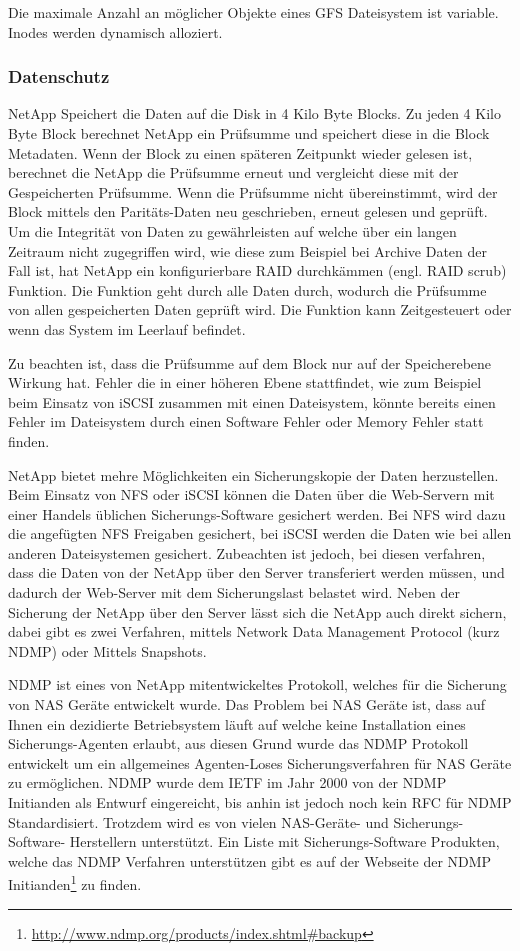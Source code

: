 Die maximale Anzahl an möglicher Objekte eines GFS Dateisystem ist variable. Inodes werden dynamisch alloziert.

\subsubsection*{Datenschutz}
NetApp Speichert die Daten auf die Disk in 4 Kilo Byte Blocks. Zu jeden 4 Kilo Byte Block berechnet NetApp ein Prüfsumme und speichert diese in die Block Metadaten. Wenn der Block zu einen späteren Zeitpunkt wieder gelesen ist, berechnet die NetApp die Prüfsumme erneut und vergleicht diese mit der Gespeicherten Prüfsumme. Wenn die Prüfsumme nicht übereinstimmt, wird der Block mittels den Paritäts-Daten neu geschrieben, erneut gelesen und geprüft. Um die Integrität von Daten zu gewährleisten auf welche über ein langen Zeitraum nicht zugegriffen wird, wie diese zum Beispiel bei Archive Daten der Fall ist, hat NetApp ein konfigurierbare RAID durchkämmen (engl. RAID scrub) Funktion. Die Funktion geht durch alle Daten durch, wodurch die Prüfsumme von allen gespeicherten Daten geprüft wird. Die Funktion kann Zeitgesteuert oder wenn das System im Leerlauf befindet. \cite{Sundaram2006}

Zu beachten ist, dass die Prüfsumme auf dem Block nur auf der Speicherebene Wirkung hat. Fehler die in einer höheren Ebene stattfindet, wie zum Beispiel beim Einsatz von iSCSI zusammen mit einen Dateisystem, könnte bereits einen Fehler im Dateisystem durch einen Software Fehler oder Memory Fehler statt finden. 

NetApp bietet mehre Möglichkeiten ein Sicherungskopie der Daten herzustellen. Beim Einsatz von NFS oder iSCSI können die Daten über die Web-Servern mit einer Handels üblichen Sicherungs-Software gesichert werden. Bei NFS wird dazu die angefügten NFS Freigaben gesichert, bei iSCSI werden die Daten wie bei allen anderen Dateisystemen gesichert. Zubeachten ist jedoch, bei diesen verfahren, dass die Daten von der NetApp über den Server transferiert werden müssen, und dadurch der Web-Server mit dem Sicherungslast belastet wird. Neben der Sicherung der NetApp über den Server lässt sich die NetApp auch direkt sichern, dabei gibt es zwei Verfahren, mittels Network Data Management Protocol (kurz NDMP) oder Mittels Snapshots. 

NDMP ist eines von NetApp mitentwickeltes Protokoll, welches für die Sicherung von NAS Geräte entwickelt wurde. Das Problem bei NAS Geräte ist, dass auf Ihnen ein dezidierte Betriebsystem läuft auf welche keine Installation eines Sicherungs-Agenten erlaubt, aus diesen Grund wurde das NDMP Protokoll entwickelt um ein allgemeines Agenten-Loses Sicherungsverfahren für NAS Geräte zu ermöglichen. NDMP wurde dem IETF im Jahr 2000 von der NDMP Initianden als Entwurf eingereicht, bis anhin ist jedoch noch kein RFC für NDMP Standardisiert. Trotzdem wird es von vielen NAS-Geräte- und Sicherungs-Software- Herstellern unterstützt. Ein Liste mit Sicherungs-Software Produkten, welche das NDMP Verfahren unterstützen gibt es auf der Webseite der NDMP Initianden\footnote{\url{http://www.ndmp.org/products/index.shtml#backup}} zu finden. \cite{NDMP.orga}\cite{NDMP.org}

